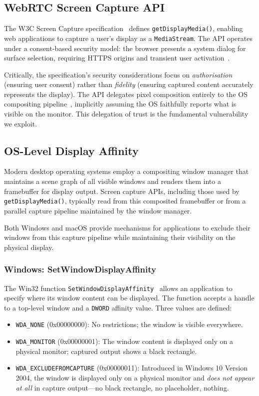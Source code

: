 \documentclass[conference]{IEEEtran}
\begin{document}
\subsection{WebRTC Screen Capture API}

The W3C Screen Capture specification~\cite{bruaroey2025screen} defines \texttt{getDisplayMedia()}, enabling web applications to capture a user's display as a \texttt{MediaStream}. The API operates under a consent-based security model: the browser presents a system dialog for surface selection, requiring HTTPS origins and transient user activation~\cite{bruaroey2025screen}.

Critically, the specification's security considerations focus on \textit{authorisation} (ensuring user consent) rather than \textit{fidelity} (ensuring captured content accurately represents the display). The API delegates pixel composition entirely to the OS compositing pipeline~\cite{mdn2025screencapture}, implicitly assuming the OS faithfully reports what is visible on the monitor. This delegation of trust is the fundamental vulnerability we exploit.

\subsection{OS-Level Display Affinity}

Modern desktop operating systems employ a compositing window manager that maintains a scene graph of all visible windows and renders them into a framebuffer for display output. Screen capture APIs, including those used by \texttt{getDisplayMedia()}, typically read from this composited framebuffer or from a parallel capture pipeline maintained by the window manager.

Both Windows and macOS provide mechanisms for applications to exclude their windows from this capture pipeline while maintaining their visibility on the physical display.

\subsubsection{Windows: SetWindowDisplayAffinity}

The Win32 function \texttt{SetWindowDisplayAffinity}~\cite{microsoft2025setwindow} allows an application to specify where its window content can be displayed. The function accepts a handle to a top-level window and a \texttt{DWORD} affinity value. Three values are defined:

\begin{itemize}
\item \texttt{WDA\_NONE} (0x00000000): No restrictions; the window is visible everywhere.
\item \texttt{WDA\_MONITOR} (0x00000001): The window content is displayed only on a physical monitor; captured output shows a black rectangle.
\item \texttt{WDA\_EXCLUDEFROMCAPTURE} (0x00000011): Introduced in Windows 10 Version 2004, the window is displayed only on a physical monitor and \textit{does not appear at all} in capture output---no black rectangle, no placeholder, nothing.
\end{itemize}
\end{document}
